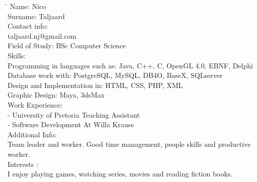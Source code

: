 \documentclass[12pt]{article}
\begin{document}
	\begin{tabbing}
		\hspace*{3.5cm}\=\hspace*{3cm} \kill
		Name: \> Nico \\
		Surname: \> Taljaard \\
		Contact info:  \\
			\> taljaard.nj@gmail.com \\
		Field of Study: \>  BSc Computer Science \\
		Skills:	 \>\\		
			\>	Programming in languages such as: Java, C++, C, OpenGL 4.0, EBNF, Delphi \\
			\>	Database work with: PostgreSQL, MySQL, DB4O, BaseX, SQLserver \\
			\>	Design and Implementation in: HTML, CSS, PHP, XML \\ 
			\>	Graphic Design: Maya, 3dsMax \\				
		Work Experience:	\\		
			 - University of Pretoria Teaching Assistant \\
			 - Software Development At Willa Krause \\
		Additional Info: \\
		\> Team leader and worker. Good time management, people skills and productive \\ \> worker. \\
		Interests : \\
		\> I enjoy playing games, watching series, movies and reading fiction books. \\
	\end{tabbing}
\end{document}
